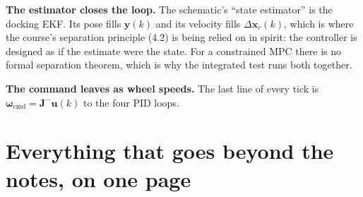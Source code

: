 \documentclass[11pt,a4paper]{article}
\newcommand{\vect}[1]{\bm{#1}}
\newcommand{\mat}[1]{\bm{#1}}
\begin{document}
\textbf{The estimator closes the loop.} The schematic's ``state estimator'' is the docking EKF. Its pose fills $\vect y(k)$ and its velocity fills $\Delta\vect x_c(k)$, which is where the course's separation principle (4.2) is being relied on in spirit: the controller is designed as if the estimate were the state. For a constrained MPC there is no formal separation theorem, which is why the integrated test runs both together.

\textbf{The command leaves as wheel speeds.} The last line of every tick is $\vect\omega_{\mathrm{cmd}} = \mat J^{-}\vect u(k)$ to the four PID loops.

\section{Everything that goes beyond the notes, on one page}
\end{document}
